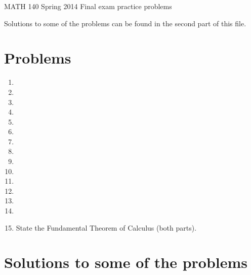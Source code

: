 \documentclass{article}[12pt]
\begin{document}
\begin{center}
MATH 140 Spring 2014 Final exam practice problems 
\end{center}
Solutions to some of the problems can be found in the second part of this file.

\section{Problems}
\begin{enumerate}
\item 

\item 
\item 

\item 
\item 
\item 
\item 
\item 
\item 

\item 
\item 
\item 
\item 
\item  
\item State the Fundamental Theorem of Calculus (both parts).
\end{enumerate}
\section{Solutions to some of the problems}
\end{document}
